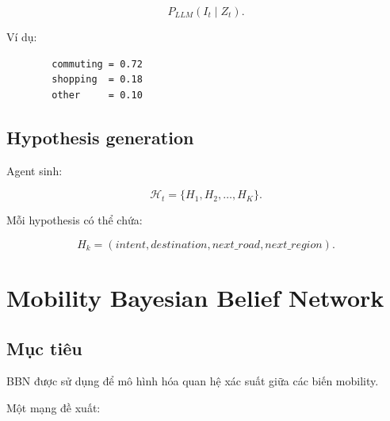 \documentclass[11pt,a4paper]{article}
\begin{document}
	\begin{equation}
		P_{LLM}(I_t\mid Z_t).
	\end{equation}
	
	Ví dụ:
	
	\begin{verbatim}
		commuting = 0.72
		shopping  = 0.18
		other     = 0.10
	\end{verbatim}
	
	\subsection{Hypothesis generation}
	
	Agent sinh:
	
	\begin{equation}
		\mathcal{H}_t
		=
		\{
		H_1,H_2,\ldots,H_K
		\}.
	\end{equation}
	
	Mỗi hypothesis có thể chứa:
	
	\begin{equation}
		H_k
		=
		(
		intent,
		destination,
		next\_road,
		next\_region
		).
	\end{equation}
	
	\section{Mobility Bayesian Belief Network}
	
	\subsection{Mục tiêu}
	
	BBN được sử dụng để mô hình hóa quan hệ xác suất giữa các biến mobility.
	
	Một mạng đề xuất:
	
\end{document}

